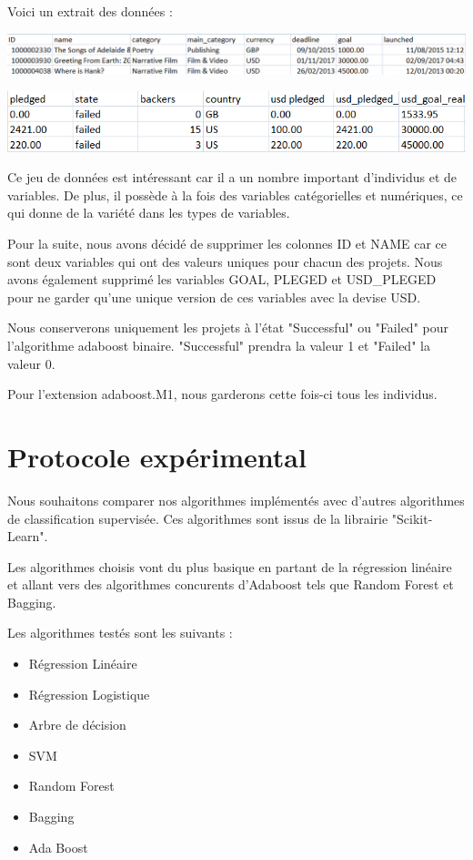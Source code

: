 \documentclass{article}
\begin{document}
\noindent Voici un extrait des données :

\begin{center} \includegraphics[scale=0.55]{extrait_donnees_partie1.PNG} \end{center}
\begin{center} \includegraphics[scale=0.55]{extrait_donnees_partie2.PNG} \end{center}
\noindent Ce jeu de données est intéressant car il a un nombre important d'individus et de variables. De plus, il possède à la fois des variables catégorielles et numériques, ce qui donne de la variété dans les types de variables. \newline

\noindent Pour la suite, nous avons décidé de supprimer les colonnes ID et NAME car ce sont deux variables qui ont des valeurs uniques pour chacun des projets. Nous avons également supprimé les variables GOAL, PLEGED et USD\_PLEGED pour ne garder qu'une unique version de ces variables avec la devise USD.\newline

\noindent Nous conserverons uniquement les projets à l'état "Successful" ou "Failed" pour l'algorithme adaboost binaire. "Successful" prendra la valeur 1 et "Failed" la valeur 0.\newline

\noindent Pour l'extension adaboost.M1, nous garderons cette fois-ci tous les individus.


\section{Protocole expérimental}

Nous souhaitons comparer nos algorithmes implémentés avec d'autres algorithmes de classification supervisée. Ces algorithmes sont issus de la librairie "Scikit-Learn". 

Les algorithmes choisis vont du plus basique en partant de la régression linéaire et allant vers des algorithmes concurents d'Adaboost tels que Random Forest et Bagging.

Les algorithmes testés sont les suivants :
\begin{itemize}
    \item Régression Linéaire 
    \item Régression Logistique
    \item Arbre de décision
    \item SVM
    \item Random Forest
    \item Bagging
    \item Ada Boost
\end{itemize}
\end{document}
